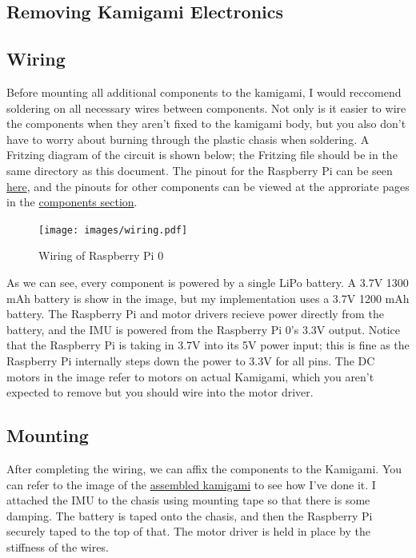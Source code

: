 \documentclass[11pt]{article}
\begin{document}
\subsection{Removing Kamigami Electronics}

\subsection{Wiring}

Before mounting all additional components to the kamigami, I would reccomend soldering on all necessary wires between components. Not only is it easier to wire the components when they aren't fixed to the kamigami body, but you also don't have to worry about burning through the plastic chasis when soldering. A Fritzing diagram of the circuit is shown below; the Fritzing file should be in the same directory as this document.
The pinout for the Raspberry Pi can be seen \href{https://pinout.xyz}{here},
and the pinouts for other components can be viewed at the approriate pages in the \hyperref[sec:components]{components section}.

\begin{figure}[h]
    \centering
    \texttt{[image: images/wiring.pdf]}
    \caption{Wiring of Raspberry Pi 0}
    \label{fig:wiring}
\end{figure}

As we can see, every component is powered by a single LiPo battery. A 3.7V 1300 mAh battery is show in the image, but my implementation uses a 3.7V 1200 mAh battery. The Raspberry Pi and motor drivers recieve power directly from the battery, and the IMU is powered from the Raspberry Pi 0's 3.3V output. Notice that the Raspberry Pi is taking in 3.7V into its 5V power input; this is fine as the Raspberry Pi internally steps down the power to 3.3V for all pins. The DC motors in the image refer to motors on actual Kamigami, which you aren't expected to remove but you should wire into the motor driver.

\subsection{Mounting}
After completing the wiring, we can affix the components to the Kamigami. You can refer to the image of the \hyperref[fig:kamigami]{assembled kamigami} to see how I've done it. 
I attached the IMU to the chasis using mounting tape so that there is some damping. The battery is taped onto the chasis, and then the Raspberry Pi securely taped to the top of that. The motor driver is held in place by the stiffness of the wires.
\end{document}
